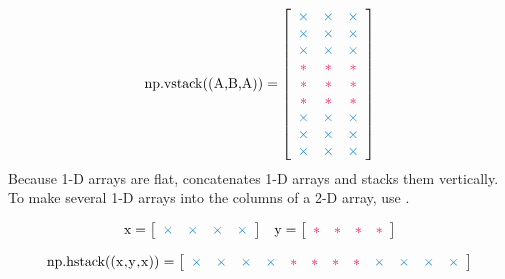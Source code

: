 \begin{align*}
\text{\li{np.vstack((A,B,A))}} =
\left[\begin{array}{ccc}
\textcolor{blue}{\times}&\textcolor{blue}{\times}&\textcolor{blue}{\times}\\
\textcolor{blue}{\times}&\textcolor{blue}{\times}&\textcolor{blue}{\times}\\
\textcolor{blue}{\times}&\textcolor{blue}{\times}&\textcolor{blue}{\times}\\
\textcolor{red}{*} & \textcolor{red}{*} & \textcolor{red}{*} \\
\textcolor{red}{*} & \textcolor{red}{*} & \textcolor{red}{*} \\
\textcolor{red}{*} & \textcolor{red}{*} & \textcolor{red}{*} \\
\textcolor{blue}{\times}&\textcolor{blue}{\times}&\textcolor{blue}{\times}\\
\textcolor{blue}{\times}&\textcolor{blue}{\times}&\textcolor{blue}{\times}\\
\textcolor{blue}{\times}&\textcolor{blue}{\times}&\textcolor{blue}{\times}
\end{array}\right]
\end{align*}
Because 1-D arrays are flat,  concatenates 1-D arrays and  stacks them vertically.
To make several 1-D arrays into the columns of a 2-D array, use .

\begin{align*}
\text{\li{x}} = \left[\begin{array}{cccc}
\textcolor{blue}{\times}&\textcolor{blue}{\times}&\textcolor{blue}{\times}&\textcolor{blue}{\times}
\end{array}\right]
&&
\text{\li{y}} = \left[\begin{array}{cccc}
\textcolor{red}{*}&\textcolor{red}{*}&\textcolor{red}{*}&\textcolor{red}{*}\end{array}\right]
\end{align*}

\begin{align*}
\text{\li{np.hstack((x,y,x))}} =
\left[\begin{array}{cccccccccccc}
\textcolor{blue}{\times}&\textcolor{blue}{\times}&\textcolor{blue}{\times}&\textcolor{blue}{\times}&
\textcolor{red}{*}&\textcolor{red}{*}&\textcolor{red}{*}&\textcolor{red}{*}&
\textcolor{blue}{\times}&\textcolor{blue}{\times}&\textcolor{blue}{\times}&\textcolor{blue}{\times}
\end{array}\right]
\end{align*}

